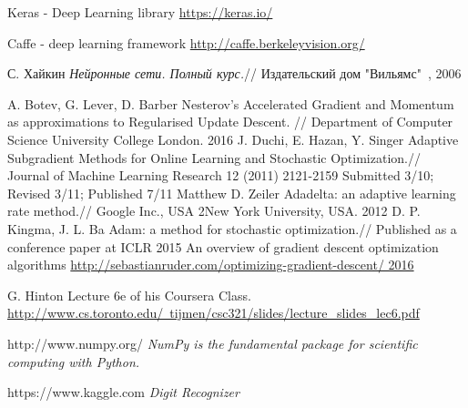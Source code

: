 \documentclass[oneside,final,14pt]{extreport}
\newcommand{\tocsecindent}{\hspace{7mm}}
\begin{document}
\begin{thebibliography}{00}
\addcontentsline{toc}{chapter}{\tocsecindent{Литература}}

Keras - Deep Learning library
\href{https://keras.io/}{https://keras.io/}

Caffe - deep learning framework
\href{http://caffe.berkeleyvision.org/}{http://caffe.berkeleyvision.org/}

 С. Хайкин
\emph{Нейронные сети. Полный курс.}// Издательский дом "Вильямс"\ , 2006

A. Botev, G. Lever, D. Barber Nesterov’s Accelerated Gradient and Momentum as approximations to Regularised Update Descent. // Department of Computer Science University College London. 2016
J. Duchi, E. Hazan, Y. Singer
Adaptive Subgradient Methods for Online Learning and Stochastic Optimization.//  Journal of Machine Learning Research 12 (2011) 2121-2159 Submitted 3/10; Revised 3/11; Published 7/11
Matthew D. Zeiler Adadelta: an adaptive learning rate method.// Google Inc., USA 2New York University, USA. 2012
D. P. Kingma, J. L. Ba Adam: a method for stochastic optimization.// Published as a conference paper at ICLR 2015
An overview of gradient descent optimization algorithms
\href{http://sebastianruder.com/optimizing-gradient-descent/ 2016}{http://sebastianruder.com/optimizing-gradient-descent/ 2016}

G. Hinton Lecture 6e of his Coursera Class.
\href{"http://www.cs.toronto.edu/tijmen/csc321/slides/lecture_slides_lec6.pdf"}{http://www.cs.toronto.edu/~tijmen/csc321/slides/lecture\_slides\_lec6.pdf}

 http://www.numpy.org/
\emph{NumPy is the fundamental package for scientific computing with Python.}

 https://www.kaggle.com
\emph{Digit Recognizer}



\end{thebibliography}
\end{document}
